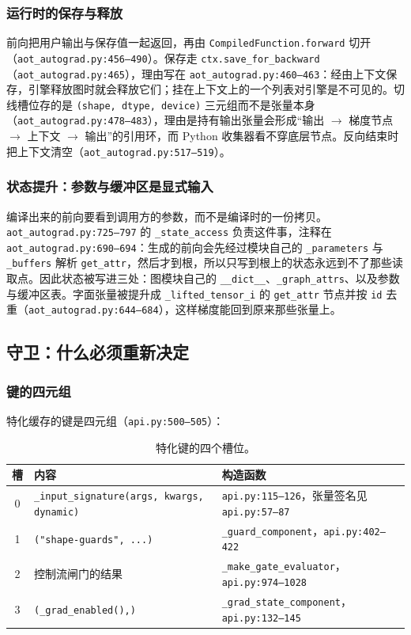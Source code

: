 \subsubsection{运行时的保存与释放}

前向把用户输出与保存值一起返回，再由 \texttt{CompiledFunction.forward} 切开（\texttt{aot\_autograd.py:456--490}）。保存走 \texttt{ctx.save\_for\_backward}（\texttt{aot\_autograd.py:465}），理由写在 \texttt{aot\_autograd.py:460--463}：经由上下文保存，引擎释放图时就会释放它们；挂在上下文上的一个列表对引擎是不可见的。切线槽位存的是 \texttt{(shape, dtype, device)} 三元组而不是张量本身（\texttt{aot\_autograd.py:478--483}），理由是持有输出张量会形成“输出 $\to$ 梯度节点 $\to$ 上下文 $\to$ 输出”的引用环，而 Python 收集器看不穿底层节点。反向结束时把上下文清空（\texttt{aot\_autograd.py:517--519}）。

\subsubsection{状态提升：参数与缓冲区是显式输入}

编译出来的前向要看到调用方的参数，而不是编译时的一份拷贝。\texttt{aot\_autograd.py:725--797} 的 \texttt{\_state\_access} 负责这件事，注释在 \texttt{aot\_autograd.py:690--694}：生成的前向会先经过模块自己的 \texttt{\_parameters} 与 \texttt{\_buffers} 解析 \texttt{get\_attr}，然后才到根，所以只写到根上的状态永远到不了那些读取点。因此状态被写进三处：图模块自己的 \texttt{\_\_dict\_\_}、\texttt{\_graph\_attrs}、以及参数与缓冲区表。字面张量被提升成 \texttt{\_lifted\_tensor\_i} 的 \texttt{get\_attr} 节点并按 \texttt{id} 去重（\texttt{aot\_autograd.py:644--684}），这样梯度能回到原来那些张量上。

\subsection{守卫：什么必须重新决定}
\label{sec:fe:guards}

\subsubsection{键的四元组}

特化缓存的键是四元组（\texttt{api.py:500--505}）：

\begin{table}[H]
\centering
\caption{特化键的四个槽位。}
\label{tab:fe:key}
\small
\begin{tabular}{cll}
\toprule
槽 & 内容 & 构造函数 \\
\midrule
0 & \texttt{\_input\_signature(args, kwargs, dynamic)} & \texttt{api.py:115--126}，张量签名见 \texttt{api.py:57--87} \\
1 & \texttt{("shape-guards", ...)} & \texttt{\_guard\_component}，\texttt{api.py:402--422} \\
2 & 控制流闸门的结果 & \texttt{\_make\_gate\_evaluator}，\texttt{api.py:974--1028} \\
3 & \texttt{(\_grad\_enabled(),)} & \texttt{\_grad\_state\_component}，\texttt{api.py:132--145} \\
\bottomrule
\end{tabular}
\end{table}

